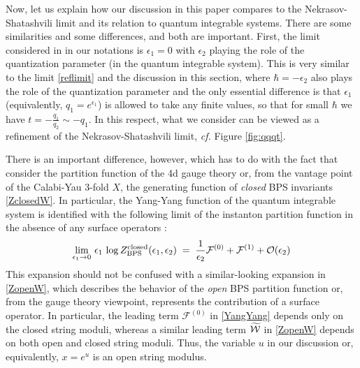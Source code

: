 \documentclass[hyper,letterpaper]{JHEP3}
\newcommand{\be}{\begin{equation}}
\newcommand{\ee}{\end{equation}}
\newcommand{\cF}{{\mathcal{F}}}
\newcommand{\cO}{{\cal O }}
\begin{document}
Now, let us explain how our discussion in this paper compares to the Nekrasov-Shatashvili limit
and its relation to quantum integrable systems.
There are some similarities and some differences, and both are important.
First, the limit considered in \cite{NS} in our notations is
$\epsilon_1 = 0$ with $\epsilon_2$ playing the role of the quantization parameter (in the quantum integrable system).
This is very similar to the limit \eqref{reflimit} and the discussion in this section,
where $\hbar = - \epsilon_2$ also plays the role of the quantization parameter
and the only essential difference is that $\epsilon_1$ (equivalently, $q_1 = e^{\epsilon_1}$)
is allowed to take any finite values, so that for small $\hbar$ we have $t = - \frac{q_1}{q_2} \sim - q_1$.
In this respect, what we consider can be viewed as a refinement of the Nekrasov-Shatashvili limit, {\it cf.} Figure \ref{fig:qqqt}.

There is an important difference, however, which has to do with the fact that \cite{NS}
consider the partition function of the 4d gauge theory or, from the vantage point of the Calabi-Yau 3-fold $X$,
the generating function of {\it closed} BPS invariants \eqref{ZclosedW}.
In particular, the Yang-Yang function of the quantum integrable system
is identified with the following limit of the instanton partition function
in the absence of any surface operators \cite{NS}:
\be
\lim_{\epsilon_1 \to 0} \, \epsilon_1 \, \log Z_{\text{BPS}}^{\text{closed}} (\epsilon_1, \epsilon_2)
\; = \; \frac{1}{\epsilon_2} \cF^{(0)} + \cF^{(1)} + \cO (\epsilon_2)
\label{YangYang}
\ee
This expansion should not be confused with a similar-looking expansion in \eqref{ZopenW},
which describes the behavior of the {\it open} BPS partition function or,
from the gauge theory viewpoint, represents the contribution of a surface operator.
In particular, the leading term $\cF^{(0)}$ in \eqref{YangYang} depends only on the closed string moduli,
whereas a similar leading term $\widetilde{\cal W}$ in \eqref{ZopenW} depends on both open and closed string moduli.
Thus, the variable $u$ in our discussion or, equivalently, $x = e^u$ is an open string modulus.
\end{document}

